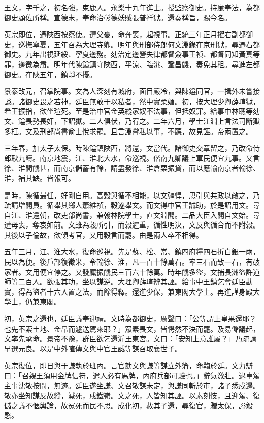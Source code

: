 \begin{pinyinscope}
王文，字千之，初名強，束鹿人。永樂十九年進士。授監察御史。持廉奉法，為都御史顧佐所稱。宣德末，奉命治彰德妖賊張普祥獄。還奏稱旨，賜今名。

英宗即位，遷陜西按察使。遭父憂，命奔喪，起視事。正統三年正月擢右副都御史，巡撫寧夏，五年召為大理寺卿。明年與刑部侍郎何文淵錄在京刑獄，尋遷右都御史。九年出視延綏、寧夏邊務。劾治定邊營失律都督僉事王禎、都督同知黃真等罪，邊徼為肅。明年代陳鎰鎮守陜西，平涼、臨洮、鞏昌饑，奏免其租。尋進左都御史。在陜五年，鎮靜不擾。

景泰改元，召掌院事。文為人深刻有城府，面目嚴冷，與陳鎰同官，一揖外未嘗接談。諸御史畏之若神，廷臣無敢干以私者，然中實柔媚。初，按大理少卿薛瑄獄，希王振指，欲坐瑄死。至是治中官金英縱家奴不法事，但抵奴罪。給事中林聰等劾文、鎰畏勢長奸，下詔獄。二人俱伏，乃宥之。二年六月，學士江淵上言法司斷獄多枉。文及刑部尚書俞士悅求罷。且言淵嘗私以事，不聽，故見誣。帝兩置之。

三年春，加太子太保。時陳鎰鎮陜西，將還，文當代。諸御史交章留之，乃改命侍郎耿九疇。南京地震，江、淮北大水，命巡視。偕南九卿議上軍民便宜九事。又言徐、淮間饑甚，而南京儲蓄有餘，請盡發徐、淮倉粟振貸，而以應輸南京者輸徐、淮，補其缺。皆報可。

是時，陳循最任，好剛自用。高穀與循不相能，以文彊悍，思引與共政以敵之，乃疏請增閣員。循舉其鄉人蕭維禎，穀遂舉文。而文得中官王誠助，於是詔用文。尋自江、淮還朝，改吏部尚書，兼翰林院學士，直文淵閣。二品大臣入閣自文始。尋遭母喪，奪哀如前。文雖為穀所引，而穀遲重，循性明決，文反與循合而不附穀。其後以子倫故，欲傾考官，又用穀言而罷。由是兩人卒不相得。

五年三月，江、淮大水，復命巡視。先是蘇、松、常、鎮四府糧四石折白銀一兩，民以為便。後戶部復徵米，令輸徐、淮，凡一百十餘萬石。率三石而致一石，有破家者。文用便宜停之。又發廩振饑民三百六十餘萬。時年饑多盜，文捕長洲盜許道師等二百人。欲張其功，坐以謀逆。大理卿薛瑄辨其誣。給事中王鎮乞會廷臣勘實，得為盜者十六人置之法，而餘得釋。還進少保，兼東閣大學士。再進謹身殿大學士，仍兼東閣。

初，英宗之還也，廷臣議奉迎禮。文時為都御史，厲聲曰：「公等謂上皇果還耶？也先不索土地、金帛而遽送駕來耶？」眾素畏文，皆愕然不決而罷。及易儲議起，文率先承命。景帝不豫，群臣欲乞還沂王東宮。文曰：「安知上意誰屬？」乃疏請早選元良。以是中外喧傳文與中官王誠等謀召取襄世子。

英宗復位，即日與于謙執於班內。言官劾文與謙等謀立外籓，命鞫於廷。文力辯曰：「召親王須用金牌信符，遣人必有馬牌，內府兵部可驗也。」辭氣激壯。逮車駕主事沈敬按問，無迹。廷臣遂坐謙、文召敬謀未定，與謙同斬於市，諸子悉戍邊。敬亦坐知謀反故縱，減死，戍鐵嶺。文之死，人皆知其誣。以素刻忮，且迎駕、復儲之議不愜輿論，故冤死而民不思。成化初，赦其子還，尋復官，贈太保，謚毅愍。


\end{pinyinscope}
